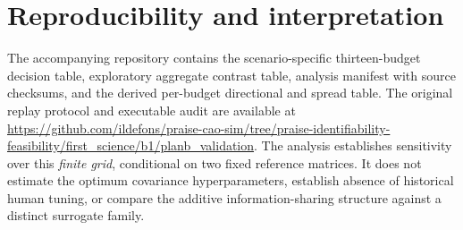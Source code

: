 \documentclass[10pt,a4paper]{article}
\begin{document}
\section*{Reproducibility and interpretation}
The accompanying repository contains the scenario-specific
thirteen-budget decision table, exploratory aggregate contrast
table, analysis manifest with source checksums, and the derived
per-budget directional and spread table. The original replay
protocol and executable audit are available at
\url{https://github.com/ildefons/praise-cao-sim/tree/praise-identifiability-feasibility/first_science/b1/planb_validation}.
The analysis establishes sensitivity over this \emph{finite grid},
conditional on two fixed reference matrices. It does not estimate
the optimum covariance hyperparameters, establish absence of
historical human tuning, or compare the additive information-sharing
structure against a distinct surrogate family.
\end{document}
